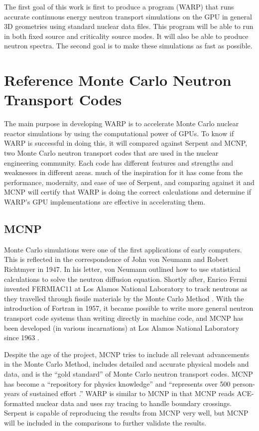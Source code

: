 The first goal of this work is first to produce a program (WARP) that runs accurate continuous energy neutron transport simulations on the GPU in general 3D geometries using standard nuclear data files.  This program will be able to run in both fixed source and criticality source modes.  It will also be able to produce neutron spectra.  The second goal is to make these simulations as fast as possible.

\section{Reference Monte Carlo Neutron Transport Codes}

The main purpose in developing WARP is to accelerate Monte Carlo nuclear reactor simulations by using the computational power of GPUs.  To know if WARP is successful in doing this, it will compared against Serpent and MCNP, two Monte Carlo neutron transport codes that are used in the nuclear engineering community.  Each code has different features and strengths and weaknesses in different areas.  much of the inspiration for it has come from the performance, modernity, and ease of use of Serpent, and comparing against it and MCNP will certify that WARP is doing the correct calculations and determine if WARP's GPU implementations are effective in accelerating them.  

\subsection{MCNP}

Monte Carlo simulations were one of the first applications of early computers.   This is reflected in the correspondence of John von Neumann and  Robert Richtmyer  in 1947.  In his letter, von Neumann outlined how to use statistical calculations to solve the neutron diffusion equation.  Shortly after, Enrico Fermi invented FERMIAC11 at Los Alamos National Laboratory to track neutrons as they travelled through fissile materials by the Monte Carlo Method \cite{mcnp}.  With the introduction of Fortran in 1957, it became possible to write more general neutron transport code systems than writing directly in machine code, and MCNP has been developed (in various incarnations) at Los Alamos National Laboratory since 1963 \cite{mcnp}.
 
Despite the age of the project, MCNP tries to include all relevant advancements in the Monte Carlo Method, includes detailed and accurate physical models and data, and is the ``gold standard'' of Monte Carlo neutron transport codes.  MCNP has become a ``repository for physics knowledge'' and ``represents over 500 person-years of sustained effort \cite{mcnp}.''   WARP is similar to MCNP in that MCNP reads ACE-formatted nuclear data and uses ray tracing to handle boundary crossings.  Serpent is capable of reproducing the results from MCNP very well, but MCNP will be included in the comparisons to further validate the results.

